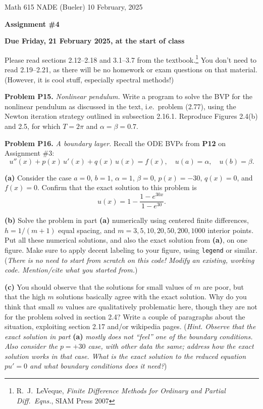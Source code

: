 \documentclass[12pt]{amsart}
\newcommand{\prob}[1]{\bigskip\noindent\textbf{#1}\quad }
\newcommand{\epart}[1]{\medskip\noindent\textbf{(#1)}\quad }
\begin{document}
\scriptsize \noindent Math 615 NADE (Bueler) \hfill 10 February, 2025
\normalsize

\medskip\bigskip

\Large\centerline{\textbf{Assignment \#4}}
\large
\bigskip

\centerline{\textbf{Due Friday, 21 February 2025, at the start of class}}
\bigskip
\normalsize

\thispagestyle{empty}

\bigskip
Please read sections 2.12--2.18 and 3.1--3.7 from the textbook.\footnote{R.~J.~LeVeque, \emph{Finite Difference Methods for Ordinary and Partial Diff.~Eqns.}, SIAM Press 2007}  You don't need to read 2.19--2.21, as there will be no homework or exam questions on that material.  (However, it is cool stuff, especially spectral methods!)

\prob{Problem P15.}  \emph{Nonlinear pendulum.}   Write a program to solve the BVP for the nonlinear pendulum as discussed in the text, i.e.~problem (2.77), using the Newton iteration strategy outlined in subsection 2.16.1.  Reproduce Figures 2.4(b) and 2.5, for which $T=2\pi$ and $\alpha=\beta=0.7$.


\prob{Problem P16.}  \emph{A boundary layer.}   Recall the ODE BVPs from \textbf{P12} on Assignment \#3:
\begin{equation*}
u''(x) + p(x)\, u'(x) + q(x)\, u(x) = f(x), \quad u(a) = \alpha, \quad u(b) = \beta.
\end{equation*}

\epart{a}  Consider the case $a=0$, $b=1$, $\alpha=1$, $\beta=0$, $p(x)=-30$, $q(x)=0$, and $f(x)=0$.  Confirm that the exact solution to this problem is
    $$u(x) = 1 - \frac{1 - e^{30x}}{1-e^{30}}.$$

\epart{b}  Solve the problem in part \textbf{(a)} numerically using centered finite differences, $h=1/(m+1)$ equal spacing, and $m=3,5,10,20,50,200,1000$ interior points.  Put all these numerical solutions, and also the exact solution from \textbf{(a)}, on one figure.  Make sure to apply decent labeling to your figure, using \texttt{legend} or similar.  (\emph{There is no need to start from scratch on this code!  Modify an existing, working code.  Mention/cite what you started from.})

\epart{c}  You should observe that the solutions for small values of $m$ are poor, but that the high $m$ solutions basically agree with the exact solution.  Why do you think that small $m$ values are qualitatively problematic here, though they are not for the problem solved in section 2.4?   Write a couple of paragraphs about the situation, exploiting section 2.17 and/or wikipedia pages. (\emph{Hint.  Observe that the exact solution in part} \textbf{(a)} \emph{mostly does not ``feel'' one of the boundary conditions.  Also consider the $p=+30$ case, with other data the same; address how the exact solution works in that case.  What is the exact solution to the reduced equation $pu'=0$ and what boundary conditions does it need?})
\end{document}
